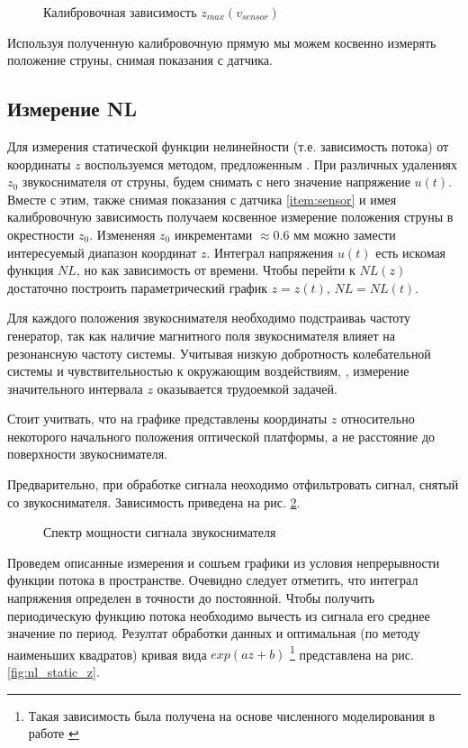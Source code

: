 \documentclass{article}
\begin{document}
\begin{figure}[h]
    \centering
    
    \caption{Калибровочная зависимость $z_{max}(v_{sensor})$}
    \label{fig:model}
\end{figure}

Используя полученную калибровочную прямую мы можем косвенно измерять положение струны,
снимая показания с датчика.

\subsection{Измерение NL}

Для измерения статической функции нелинейности (т.е. зависимость потока) от координаты $z$
воспользуемся методом, предложенным \cite{novak:hal-02512148}. При различных удалениях $z_0$ звукоснимателя от струны,
будем снимать с него значение напряжение $u(t)$. Вместе с этим, также снимая показания с датчика \ref{item:sensor} и имея
калибровочную зависимость получаем косвенное измерение положения струны в окрестности $z_0$. Измененяя $z_0$ инкрементами
$\approx 0.6$ мм можно замести интересуемый диапазон координат $z$. 
Интеграл напряжения $u(t)$ есть искомая функция $NL$, но как
зависимость от времени. Чтобы перейти к $NL(z)$ достаточно построить параметрический график $z = z(t)$, $NL = NL(t)$.

Для каждого положения звукоснимателя необходимо подстраиваь частоту генератор, так как наличие магнитного поля звукоснимателя
влияет на резонансную частоту системы. Учитывая низкую добротность колебательной системы и чувствительностью к окружающим воздействиям,
, измерение значительного интервала $z$ оказывается трудоемкой задачей.

Стоит учитвать, что на графике представлены координаты $z$ относительно некоторого начального положения оптической платформы,
а не расстояние до поверхности звукоснимателя. 

Предварительно, при обработке сигнала неоходимо отфильтровать сигнал, снятый со звукоснимателя. Зависимость приведена на
рис. \ref{fig:spectrum}.

\begin{figure}
    \centering
    
    \caption{Спектр мощности сигнала звукоснимателя}
    \label{fig:spectrum}
\end{figure}

Проведем описанные измерения и сошъем графики из условия непрерывности функции потока в пространстве.
Очевидно следует отметить, что интеграл напряжения определен в точности до постоянной. Чтобы получить периодическую функцию потока
необходимо вычесть из сигнала его среднее значение по период.
Резултат обработки данных и оптимальная (по методу наименьших квадратов)
кривая вида $exp(a z + b)$
\footnote{Такая зависимость была получена на основе численного моделирования в работе \cite{acoustics-modeling-of-a-pickup}}
представлена на рис. \ref{fig:nl_static_z}.
\end{document}
